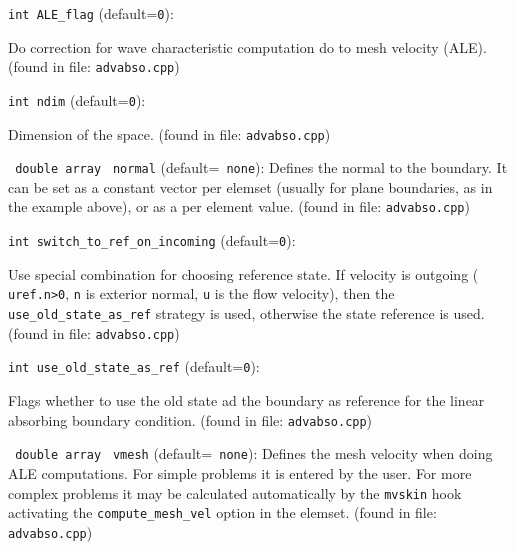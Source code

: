 \item\verb+int ALE_flag+ {\rm(default=\verb|0|)}:

Do correction for wave characteristic computation
 do to mesh velocity (ALE).
 (found in file: \verb+advabso.cpp+)
\item\verb+int ndim+ {\rm(default=\verb|0|)}:

Dimension of the space.
 (found in file: \verb+advabso.cpp+)
\item\verb+ double array+ \verb+ normal+ {\rm(default=\verb| none|)}:
 Defines the normal to the boundary. It
can be set as a constant vector per elemset (usually
for plane boundaries, as in the example above), or
as a per element   value. 
 (found in file: \verb+advabso.cpp+)
\item\verb+int switch_to_ref_on_incoming+ {\rm(default=\verb|0|)}:

Use special combination for choosing reference state.
 If velocity is outgoing ( \verb+uref.n>0+, \verb+n+ is exterior
 normal, \verb+u+ is the flow velocity), then the
 \verb+use_old_state_as_ref+ strategy is used, otherwise the
 state reference is used. 
 (found in file: \verb+advabso.cpp+)
\item\verb+int use_old_state_as_ref+ {\rm(default=\verb|0|)}:

Flags whether to use the old state ad the
boundary as reference for the linear absorbing
boundary condition.
 (found in file: \verb+advabso.cpp+)
\item\verb+ double array+ \verb+ vmesh+ {\rm(default=\verb| none|)}:
 Defines the mesh velocity when doing ALE computations.
For simple problems it is entered by the user. For more
complex problems it may be calculated automatically
by the \verb+mvskin+ hook activating the \verb+compute_mesh_vel+
option in the elemset. 
 (found in file: \verb+advabso.cpp+)
